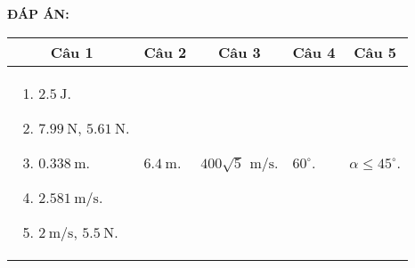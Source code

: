\textbf{ĐÁP ÁN:}

\begin{longtable}[\textwidth]{|m{}|m{}|m{}|m{}|m{}|}
	\hline%
	\multicolumn{1}{|c}{\textbf{Câu 1}} &
	\multicolumn{1}{|c|}{\textbf{Câu 2}}& 
	\multicolumn{1}{c|}{\textbf{Câu 3}} &
	\multicolumn{1}{c|}{\textbf{Câu 4}} &
	\multicolumn{1}{c|}{\textbf{Câu 5}}  \\
	\hline
	\begin{enumerate}[label=\alph*)]
		\item $\SI{2,5}{\joule}$.
		\item $\SI{7,99}{\newton}$, $\SI{5,61}{\newton}$.
		\item $\SI{0,338}{\meter}$.
		\item $\SI{2,581}{\meter/\second}$.
		\item $\SI{2}{\meter/\second}$, $\SI{5,5}{\newton}$.
	\end{enumerate} &
	$\SI{6,4}{\meter}$. &
	$400\sqrt{5}\,\SI{}{\meter/\second}$. &
	$60^\circ$. &
	$\alpha\leq 45^\circ$. 
	\\
	\hline
\end{longtable}